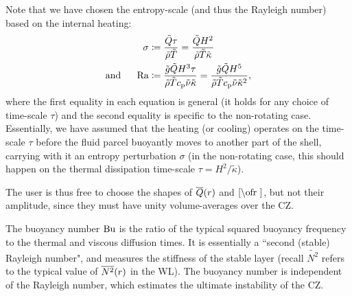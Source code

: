 \documentclass[12pt]{article}
\numberwithin{equation}{section}
\begin{document}
Note that we have chosen the entropy-scale (and thus the Rayleigh number) based on the internal heating:
\begin{subequations}
\begin{align}
	\sigma &\coloneqq \frac{\tilde{Q}\tau}{\tilde{\rho}\tilde{T}} = \frac{\tilde{Q}H^2}{\tilde{\rho}\tilde{T}\tilde{\kappa}}\label{eq:sigma}\\
	\text{and}\ \ \ \ \  {\rm{Ra}} &\coloneqq \frac{\tilde{g} \tilde{Q} H^3\tau}{\tilde{\rho}\tilde{T}c_{\rm{p}}\tilde{\nu} \tilde{\kappa}} =  \frac{\tilde{g} \tilde{Q} H^5}{\tilde{\rho}\tilde{T}c_{\rm{p}}\tilde{\nu} \tilde{\kappa}^2},\label{eq:ranonrot}\\ 
\end{align}
\end{subequations}
where the first equality in each equation is general (it holds for any choice of time-scale $\tau$) and the second equality is specific to the non-rotating case. Essentially, we have assumed that the heating (or cooling) operates on the time-scale $\tau$ before the fluid parcel buoyantly moves to another part of the shell, carrying with it an entropy perturbation $\sigma$ (in the non-rotating case, this should happen on the thermal dissipation time-scale $\tau=H^2/\tilde{\kappa}$). 

The user is thus free to choose the shapes of $\overline{Q}(r)$ and $\cref\ofr$, but not their amplitude, since they must have unity volume-averages over the CZ. 

The buoyancy number ${\rm{Bu}}$ is the ratio of the typical squared buoyancy frequency to the thermal and viscous diffusion times. It is essentially a ``second (stable) Rayleigh number", and measures the stiffness of the stable layer (recall $\widetilde{N^2}$ refers to the typical value of $\overline{N^2}(r)$ in the WL). The buoyancy number is independent of the Rayleigh number, which estimates the ultimate instability of the CZ. 
\end{document}
